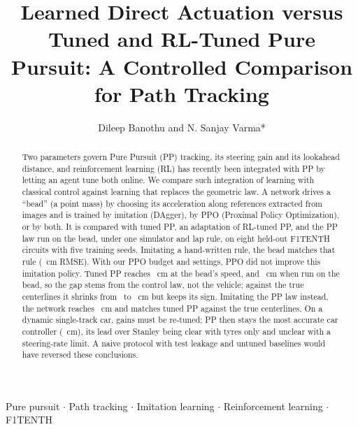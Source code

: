 \documentclass{IJCAS}
\begin{document}
\title{Learned Direct Actuation versus Tuned and RL-Tuned Pure Pursuit: A Controlled Comparison for Path Tracking}

\author{Dileep Banothu and N. Sanjay Varma*}

\begin{abstract}
Two parameters govern Pure Pursuit (PP) tracking, its steering gain and its lookahead distance, and reinforcement learning (RL) has recently been integrated with PP by letting an agent tune both online. We compare such integration of learning with classical control against learning that replaces the geometric law. A network drives a ``bead'' (a point mass) by choosing its acceleration along references extracted from images and is trained by imitation (DAgger), by PPO (Proximal Policy Optimization), or by both. It is compared with tuned PP, an adaptation of RL-tuned PP, and the PP law run on the bead, under one simulator and lap rule, on eight held-out F1TENTH circuits with five training seeds. Imitating a hand-written rule, the bead matches that rule (\VrmseDagger~cm RMSE). With our PPO budget and settings, PPO did not improve this imitation policy. Tuned PP reaches \VrmseFixM~cm at the bead's speed, and \VrmseBpp~cm when run on the bead, so the gap stems from the control law, not the vehicle; against the true centerlines it shrinks from \VcmpPoneDiff\ to \VtruePoneDiff~cm but keeps its sign. Imitating the PP law instead, the network reaches \VrmseDaggerBpp~cm and matches tuned PP against the true centerlines. On a dynamic single-track car, gains must be re-tuned; PP then stays the most accurate car controller (\VrmseDtFixH~cm), its lead over Stanley being clear with tyres only and unclear with a steering-rate limit. A naive protocol with test leakage and untuned baselines would have reversed these conclusions.
\end{abstract}

\begin{keywords}
Pure pursuit $\cdot$ Path tracking $\cdot$ Imitation learning $\cdot$ Reinforcement learning $\cdot$ F1TENTH
\end{keywords}

\maketitle

\end{document}
